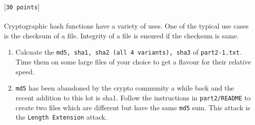 \documentclass[11pt]{article}
\begin{document}
 [\texttt{30 points}] \\\\
Cryptographic hash functions have a variety of uses. One of the typical use cases is the checksum of a file. Integrity of a file is ensured if the checksum is same.
\begin{enumerate}
	\item Calcuate the \texttt{md5, sha1, sha2 (all 4 variants), sha3} of \texttt{part2-1.txt}. Time them on some large files of your choice to get a flavour for their relative speed.
	\item \texttt{md5} has been abandoned by the crypto community a while back and the recent addition to this lot is sha1. Follow the instructions in \texttt{part2/README} to create two files which are different but have the same \texttt{md5} sum. This attack is the \texttt{Length Extension} attack.
\end{enumerate}
\end{document}
